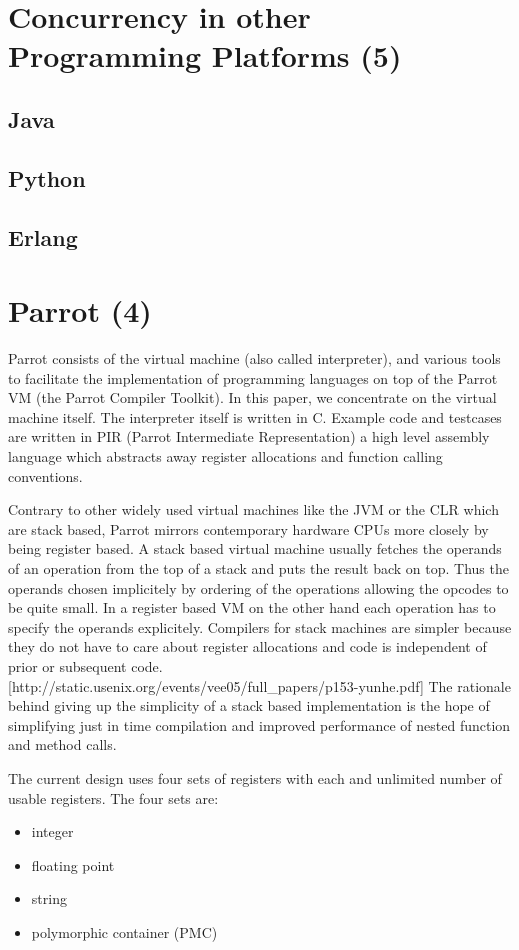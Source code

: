 \documentclass[bachelor,english]{hgbthesis}
\begin{document}
\chapter{Concurrency in other Programming Platforms (5)}

\section{Java}
\section{Python}
\section{Erlang}

\chapter{Parrot (4)}

Parrot consists of the virtual machine (also called interpreter), and various tools to facilitate the implementation of programming languages on top of the Parrot VM (the Parrot Compiler Toolkit). In this paper, we concentrate on the virtual machine itself. The interpreter itself is written in C. Example code and testcases are written in PIR (Parrot Intermediate Representation) a high level assembly language which abstracts away register allocations and function calling conventions.

Contrary to other widely used virtual machines like the JVM or the CLR which are stack based, Parrot mirrors contemporary hardware CPUs more closely by being register based. A stack based virtual machine usually fetches the operands of an operation from the top of a stack and puts the result back on top. Thus the operands chosen implicitely by ordering of the operations allowing the opcodes to be quite small. In a register based VM on the other hand each operation has to specify the operands explicitely. Compilers for stack machines are simpler because they do not have to care about register allocations and code is independent of prior or subsequent code. [http://static.usenix.org/events/vee05/full\_papers/p153-yunhe.pdf] The rationale behind giving up the simplicity of a stack based implementation is the hope of simplifying just in time compilation and improved performance of nested function and method calls.

The current design uses four sets of registers with each and unlimited number of usable registers. The four sets are:
%
\begin{itemize}
\item integer
\item floating point
\item string
\item polymorphic container (PMC)
\end{itemize}
\end{document}
